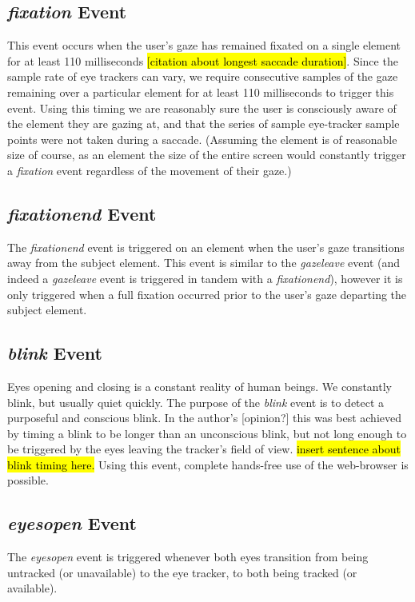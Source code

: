 \documentclass{sigchi}
\begin{document}
\subsection{\textbf{\textit{fixation}} Event}
This event occurs when the user's gaze has remained fixated on a
single element for at least 110 milliseconds \hl{[citation about 
longest saccade duration]}. Since the sample rate of eye trackers 
can vary, we require consecutive samples of the gaze remaining over a 
particular element for at least 110 milliseconds to trigger this event. 
Using this timing we are reasonably sure the user is consciously aware 
of the element they are gazing at, and that the series of sample
eye-tracker sample points were not taken during a saccade. (Assuming 
the element is of reasonable size of course, as an element the size 
of the entire screen would constantly trigger a \textit{fixation} 
event regardless of the movement of their gaze.)

\subsection{\textbf{\textit{fixationend}} Event}
The \textit{fixationend} event is triggered on an element when the 
user's gaze transitions away from the subject element. This event is
similar to the \textit{gazeleave} event (and indeed a \textit{gazeleave}
event is triggered in tandem with a \textit{fixationend}), however
it is only triggered when a full fixation occurred prior to the user's
gaze departing the subject element.

\subsection{\textbf{\textit{blink}} Event}
Eyes opening and closing is a constant reality of human beings. We
constantly blink, but usually quiet quickly. The purpose of the 
\textit{blink} event is to detect a purposeful and conscious blink. 
In the author's [opinion?] this was best achieved by timing a blink
to be longer than an unconscious blink, but not long enough to be 
triggered by the eyes leaving the tracker's field of view. \hl{insert
sentence about blink timing here.} Using this event, complete 
hands-free use of the web-browser is possible.

\subsection{\textbf{\textit{eyesopen}} Event}
The \textit{eyesopen} event is triggered whenever both eyes transition
from being untracked (or unavailable) to the eye tracker, to both
being tracked (or available).
\end{document}
